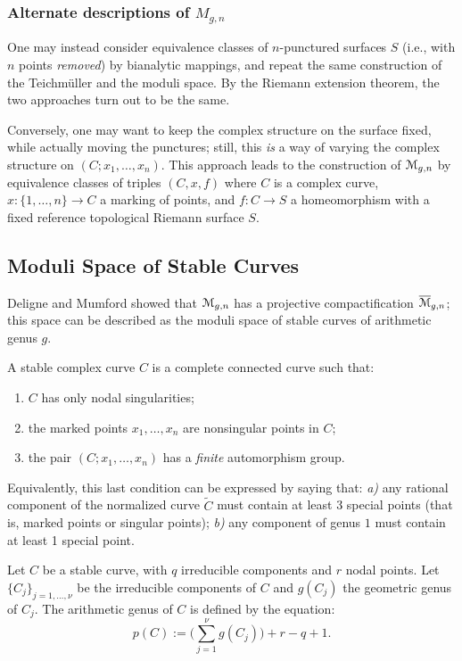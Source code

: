 \subsubsection{Alternate descriptions of $M_{g,n}$}
\label{sec:alternate-Mgn}
One may instead consider equivalence classes of $n$-punctured surfaces
$S$ (i.e., with $n$ points \emph{removed}) by bianalytic mappings, and
repeat the same construction of the Teichm\"uller and the moduli space.
By the Riemann extension theorem, the two approaches turn out to be
the same.

Conversely, one may want to keep the complex structure on the surface
fixed, while actually moving the punctures; still, this \emph{is} a
way of varying the complex structure on $(C; x_1, \dots, x_n)$. This
approach leads to the construction of $\mathcal{M}_{g,n}$ by equivalence
classes of triples $(C, x, f)$ where $C$ is a complex curve, $x: \{1,
\ldots, n\} \longrightarrow C$ a marking of points, and $f: C \to S$ a homeomorphism with a
fixed reference topological Riemann surface $S$.


\subsection{Moduli Space of Stable Curves}
\label{sec:moduli-space-stable}

Deligne and Mumford \cite{deligne-mumford} showed that $\mathcal{M}_{g,n}$ has
a projective compactification $\overline{\mathcal{M}}_{g,n}$; this space can be
described as the moduli space of stable curves of arithmetic genus
$g$.
\begin{definition}
  A stable complex curve $C$ is a complete connected curve such that:
  \begin{enumerate}
  \item $C$ has only nodal singularities;
  \item the marked points $x_1, \ldots, x_n$ are nonsingular points in
    $C$;
  \item the pair $(C; x_1, \ldots, x_n)$ has a \emph{finite} automorphism
    group.
  \end{enumerate}
\end{definition}
Equivalently, this last condition can be expressed by saying that:
\textsl{a)} any rational component of the normalized curve $\tilde C$
must contain at least 3 special points (that is, marked points or
singular points); \textsl{b)} any component of genus $1$ must contain
at least 1 special point.

Let $C$ be a stable curve, with $q$ irreducible components and $r$
nodal points. Let $\{C_j\}_{j=1, \dots, \nu}$ be the irreducible
components of $C$ and $g(C_j)$ the geometric genus of $C_j$.  The
arithmetic genus of $C$ is defined by the equation:
\begin{equation*}
  p(C) := \bigl({\textstyle \sum_{j=1}^\nu} g(C_j) \bigr) + r - q + 1.
\end{equation*}

